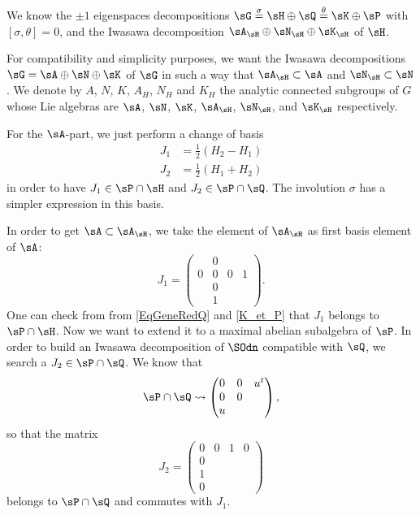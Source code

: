 We know the $\pm 1$ eigenspaces decompositions $\sG\stackrel{\sigma}{=}\sH\oplus\sQ\stackrel{\theta}{=}\sK\oplus\sP$ with $[\sigma,\theta]=0$, and the Iwasawa decomposition $\sA_{\sH}\oplus\sN_{\sH}\oplus\sK_{\sH}$ of $\sH$.

For compatibility and simplicity purposes, we want the Iwasawa decompositions $\sG=\sA\oplus\sN\oplus\sK$ of $\sG$ in such a way that $\sA_{\sH}\subset\sA$ and $\sN_{\sH}\subset\sN$.
We denote by $A$, $N$, $K$, $A_H$, $N_H$ and $K_H$ the analytic connected subgroups of $G$ whose Lie algebras are $\sA$, $\sN$, $\sK$, $\sA_{\sH}$, $\sN_{\sH}$, and $\sK_{\sH}$ respectively.


For the $\sA$-part, we just perform a change of basis
\begin{subequations}
	\begin{align}
		J_{1} & =\frac{ 1 }{2}(H_{2}-H_{1}) \\
		J_{2} & =\frac{ 1 }{2}(H_{1}+H_{2})
	\end{align}
\end{subequations}
in order to have $J_{1}\in\sP\cap\sH$ and $J_{2}\in\sP\cap\sQ$. The involution $\sigma$ has a simpler expression in this basis.

In order to get $\sA\subset\sA_{\sH}$, we take the element of $\sA_{\sH}$ as first basis element of $\sA$:
\begin{equation}		\label{EqGeueuleJun}
	J_1=
	\begin{pmatrix}
		  & 0         \\
		0 & 0 & 0 & 1 \\
		  & 0         \\
		  & 1
	\end{pmatrix}.
\end{equation}
One can check from from \eqref{EqGeneRedQ} and \eqref{K_et_P} that $J_{1}$ belongs to $\sP\cap\sH$. Now we want to extend it to a maximal abelian subalgebra of $\sP$. In order to build an Iwasawa decomposition of $\SOdn$ compatible with $\sQ$, we search a $J_2\in\sP\cap\sQ$. We know that
\[
	\sP\cap\sQ\leadsto
	\begin{pmatrix}
		0 & 0 & u^t \\
		0 & 0       \\
		u
	\end{pmatrix},
\]
so that the matrix
\begin{equation}		\label{EqgueueleJdeux}
	J_2=
	\begin{pmatrix}
		0 & 0 & 1 & 0 \\
		0             \\
		1             \\
		0
	\end{pmatrix}
\end{equation}
belongs to $\sP\cap\sQ$ and commutes with $J_1$.

